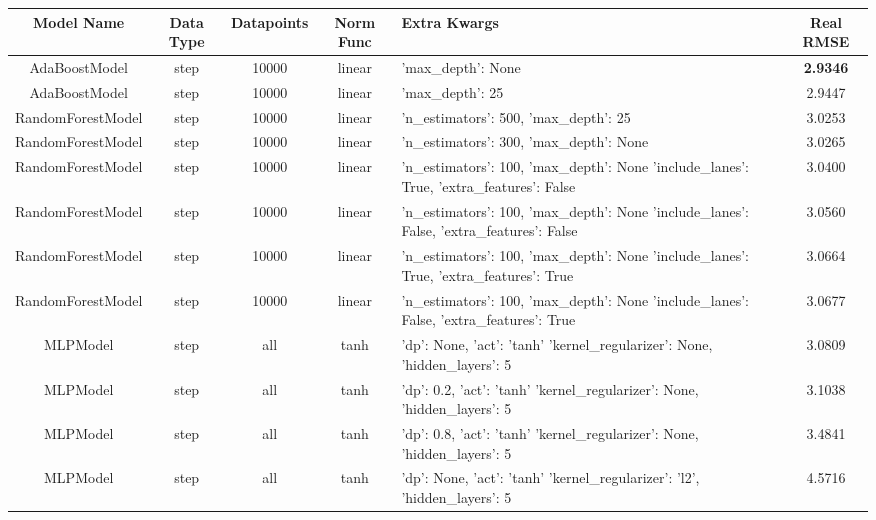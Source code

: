 \documentclass{article}
\newenvironment{changemargin}[2]{%
\begin{list}{}{%
\setlength{\topsep}{0pt}%
\setlength{\leftmargin}{#1}%
\setlength{\rightmargin}{#2}%
\setlength{\listparindent}{\parindent}%
\setlength{\itemindent}{\parindent}%
\setlength{\parsep}{\parskip}%
}%
\item[]}{\end{list}}
\begin{document}
\begin{changemargin}{-4.5cm}{-2cm}
\begin{minipage}{\linewidth}
\centering
{} \label{tab:title} 
\begin{tabular}{|c|c|c|c|p{7.25cm}|c| }\toprule[1.5pt]
Model Name & Data Type & Datapoints & Norm Func & Extra Kwargs & Real RMSE \\\hline\hline
AdaBoostModel & step & 10000 & linear & 'max\_depth': None & \bf 2.9346 \\\hline
AdaBoostModel & step & 10000 & linear & 'max\_depth': 25 & 2.9447 \\\hline
RandomForestModel & step & 10000 & linear & 'n\_estimators': 500, 'max\_depth': 25 & 3.0253 \\\hline
RandomForestModel & step & 10000 & linear & 'n\_estimators': 300, 'max\_depth': None & 3.0265 \\\hline
RandomForestModel & step & 10000 & linear & 'n\_estimators': 100, 'max\_depth': None \newline 'include\_lanes': True, 'extra\_features': False & 3.0400 \\\hline
RandomForestModel & step & 10000 & linear & 'n\_estimators': 100, 'max\_depth': None \newline 'include\_lanes': False, 'extra\_features': False & 3.0560 \\\hline
RandomForestModel & step & 10000 & linear & 'n\_estimators': 100, 'max\_depth': None \newline 'include\_lanes': True, 'extra\_features': True & 3.0664 \\\hline
RandomForestModel & step & 10000 & linear & 'n\_estimators': 100, 'max\_depth': None \newline 'include\_lanes': False, 'extra\_features': True & 3.0677 \\\hline
MLPModel & step & all & tanh & 'dp': None, 'act': 'tanh' \newline 'kernel\_regularizer': None, 'hidden\_layers': 5 & 3.0809 \\\hline
MLPModel & step & all & tanh & 'dp': 0.2, 'act': 'tanh' \newline 'kernel\_regularizer': None, 'hidden\_layers': 5 & 3.1038 \\\hline
MLPModel & step & all & tanh & 'dp': 0.8, 'act': 'tanh' \newline 'kernel\_regularizer': None, 'hidden\_layers': 5 & 3.4841 \\\hline
MLPModel & step & all & tanh & 'dp': None, 'act': 'tanh' \newline 'kernel\_regularizer': 'l2', 'hidden\_layers': 5 & 4.5716 \\\hline

\end{tabular}
\end{minipage}
\end{changemargin}
\end{document}
